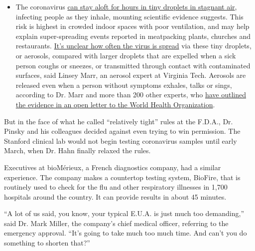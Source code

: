 \begin{itemize}
  \begin{itemize}
  \tightlist
  \item
    The coronavirus
    \href{https://www.nytimes3xbfgragh.onion/2020/07/04/health/239-experts-with-one-big-claim-the-coronavirus-is-airborne.html?action=click\&pgtype=Article\&state=default\&region=MAIN_CONTENT_3\&context=storylines_faq}{can
    stay aloft for hours in tiny droplets in stagnant air}, infecting
    people as they inhale, mounting scientific evidence suggests. This
    risk is highest in crowded indoor spaces with poor ventilation, and
    may help explain super-spreading events reported in meatpacking
    plants, churches and restaurants.
    \href{https://www.nytimes3xbfgragh.onion/2020/07/06/health/coronavirus-airborne-aerosols.html?action=click\&pgtype=Article\&state=default\&region=MAIN_CONTENT_3\&context=storylines_faq}{It's
    unclear how often the virus is spread} via these tiny droplets, or
    aerosols, compared with larger droplets that are expelled when a
    sick person coughs or sneezes, or transmitted through contact with
    contaminated surfaces, said Linsey Marr, an aerosol expert at
    Virginia Tech. Aerosols are released even when a person without
    symptoms exhales, talks or sings, according to Dr. Marr and more
    than 200 other experts, who
    \href{https://academic.oup.com/cid/article/doi/10.1093/cid/ciaa939/5867798}{have
    outlined the evidence in an open letter to the World Health
    Organization}.
  \end{itemize}
\end{itemize}

But in the face of what he called ``relatively tight'' rules at the
F.D.A., Dr. Pinsky and his colleagues decided against even trying to win
permission. The Stanford clinical lab would not begin testing
coronavirus samples until early March, when Dr. Hahn finally relaxed the
rules.

Executives at bioMérieux, a French diagnostics company, had a similar
experience. The company makes a countertop testing system, BioFire, that
is routinely used to check for the flu and other respiratory illnesses
in 1,700 hospitals around the country. It can provide results in about
45 minutes.

``A lot of us said, you know, your typical E.U.A. is just much too
demanding,'' said Dr. Mark Miller, the company's chief medical officer,
referring to the emergency approval. ``It's going to take much too much
time. And can't you do something to shorten that?''

